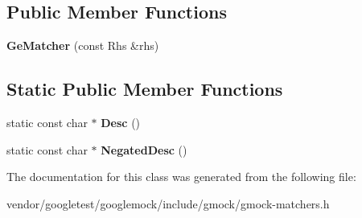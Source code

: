 \subsection*{Public Member Functions}
\begin{DoxyCompactItemize}
\item 
\mbox{\label{classtesting_1_1internal_1_1_ge_matcher_aba23cbb4040d08be1a9db09b73906182}} 
{\bfseries Ge\+Matcher} (const Rhs \&rhs)
\end{DoxyCompactItemize}
\subsection*{Static Public Member Functions}
\begin{DoxyCompactItemize}
\item 
\mbox{\label{classtesting_1_1internal_1_1_ge_matcher_a5676836bfa354f4398dd083621a05877}} 
static const char $\ast$ {\bfseries Desc} ()
\item 
\mbox{\label{classtesting_1_1internal_1_1_ge_matcher_a028847a76dbf02b8da3d56ce448ef053}} 
static const char $\ast$ {\bfseries Negated\+Desc} ()
\end{DoxyCompactItemize}


The documentation for this class was generated from the following file\+:\begin{DoxyCompactItemize}
\item 
vendor/googletest/googlemock/include/gmock/gmock-\/matchers.\+h\end{DoxyCompactItemize}
